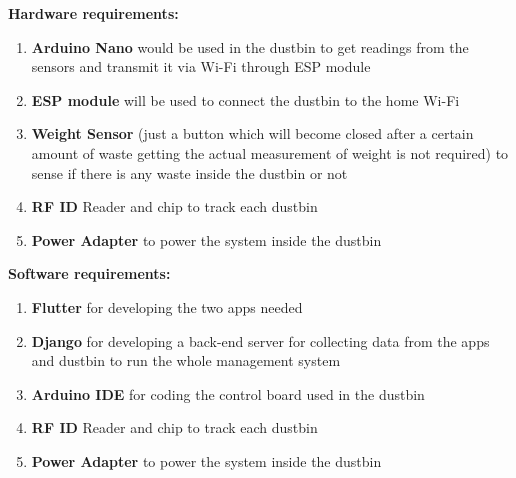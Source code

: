 \textup{\large {\bf Hardware requirements: } \\[0.00001in] }
\begin{enumerate} %
	\item{\normalsize {\bf Arduino Nano} would be used in the dustbin to get readings from the sensors and transmit it via Wi-Fi through ESP module }
	\item {\normalsize  {\bf ESP module} will be used to connect the dustbin to the home Wi-Fi}
	\item {\normalsize {\bf Weight Sensor} (just a button which will become closed after a certain amount of waste getting the actual measurement of weight is not required) to sense if there is any waste inside the dustbin or not }
	\item {\normalsize  {\bf RF ID} Reader and chip to track each dustbin}
	\item {\normalsize {\bf Power Adapter} to power the system inside the dustbin \\}
\end{enumerate}
\textup{\large {\bf Software requirements: } \\[0.00001in] }
\begin{enumerate} %
	\item{\normalsize {\bf Flutter} for developing the two apps needed}
	\item {\normalsize  {\bf Django} for developing a back-end server for collecting data from the apps and dustbin to run the whole management system}
	\item {\normalsize {\bf	Arduino IDE} for coding the control board used in the dustbin }
	\item {\normalsize  {\bf RF ID} Reader and chip to track each dustbin}
	\item {\normalsize {\bf Power Adapter} to power the system inside the dustbin}
\end{enumerate}

\newpage